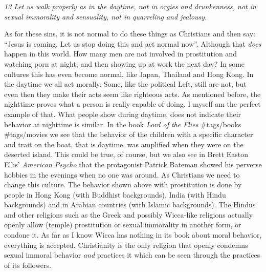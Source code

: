 \emph{13 Let us walk properly as in the daytime, not in orgies and
drunkenness, not in sexual immorality and sensuality, not in quarreling
and jealousy.}

As for these sins, it is not normal to do these things as Christians and
then say: ``Jesus is coming. Let us stop doing this and act normal
now''. Although that \emph{does} happen in this world. How many men are
not involved in prostitution and watching porn at night, and then
showing up at work the next day? In some cultures this has even become
normal, like Japan, Thailand and Hong Kong. In the daytime we all act
morally. Some, like the political Left, still are not, but even then
they make their acts seem like righteous acts. As mentioned before, the
nighttime proves what a person is really capable of doing. I myself am
the perfect example of that. What people show during daytime, does not
indicate their behavior at nighttime is similar. In the book \emph{Lord
of the Flies} \#tags/books \#tags/movies we see that the behavior of the
children with a specific character and trait on the boat, that is
daytime, was amplified when they were on the deserted island. This could
be true, of course, but we also see in Brett Easton Ellis'
\emph{American Psycho} that the protagonist Patrick Bateman showed his
perverse hobbies in the evenings when no one was around. As Christians
we need to change this culture. The behavior shown above with
prostitution is done by people in Hong Kong (with Buddhist backgrounds),
India (with Hindu backgrounds) and in Arabian countries (with Islamic
backgrounds). The Hindus and other religions such as the Greek and
possibly Wicca-like religions actually openly allow (temple)
prostitution or sexual immorality in another form, or condone it. As far
as I know Wicca has nothing in its book about moral behavior, everything
is accepted. Christianity is the only religion that openly condemns
sexual immoral behavior \emph{and} practices it which can be seen
through the practices of its followers.

